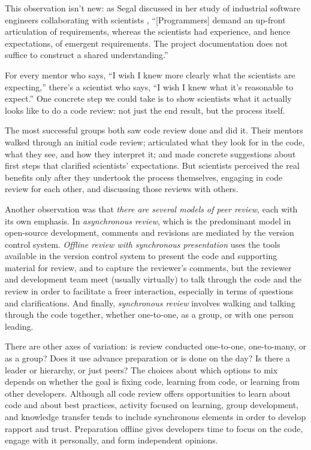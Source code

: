 \documentclass[10pt,twocolumn]{article}
\begin{document}
This observation isn't new:
as Segal discussed in her study of industrial software engineers collaborating with scientists \cite{b:segal2005},
``[Programmers] demand an up-front articulation of requirements,
whereas the scientists had experience, and hence expectations, of emergent requirements.
The project documentation does not suffice to construct a shared understanding.''

For every mentor who says,
``I wish I knew more clearly what the scientists are expecting,''
there's a scientist who says,
``I wish I knew what it's reasonable to expect.''
One concrete step we could take is to show scientists what it actually looks like to do a code review:
not just the end result, but the process itself.

The most successful groups both saw code review done and did it.
Their mentors walked through an initial code review;
articulated what they look for in the code, what they see, and how they interpret it;
and made concrete suggestions about first steps that clarified scientists' expectations.
But scientists perceived the real benefits only after they undertook the process themselves,
engaging in code review for each other,
and discussing those reviews with others.

Another observation was that \emph{there are several models of peer review},
each with its own emphasis.
In \emph{asynchronous review},
which is the predominant model in open-source development,
comments and revisions are mediated by the version control system.
\emph{Offline review with synchronous presentation}
uses the tools available in the version control system to present the code and supporting material for review,
and to capture the reviewer’s comments,
but the reviewer and development team meet (usually virtually) to talk through the code and the review
in order to facilitate a freer interaction,
especially in terms of questions and clarifications.
And finally,
\emph{synchronous review}
involves walking and talking through the code together,
whether one-to-one, as a group, or with one person leading.

There are other axes of variation:
is review conducted one-to-one, one-to-many, or as a group?
Does it use advance preparation or is done on the day?
Is there a leader or hierarchy, or just peers?
The choices about which options to mix depends on whether the goal is
fixing code, learning from code, or learning from other developers.
Although all code review offers opportunities to learn about code and about best practices,
activity focused on learning, group development, and knowledge transfer tends to include synchronous elements
in order to develop rapport and trust.
Preparation offline gives developers time to focus on the code,
engage with it personally,
and form independent opinions. 
\end{document}
